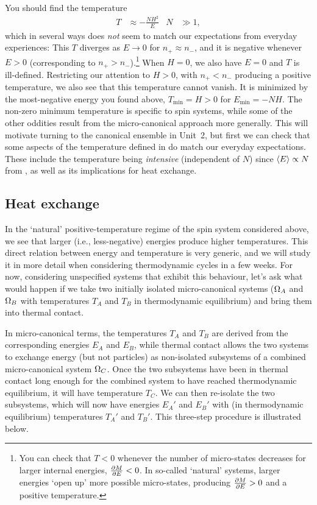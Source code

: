 You should find the temperature
\begin{align}
  T & \approx -\frac{NH^2}{E} &
  N & \gg 1,
\end{align}
which in several ways does \textit{not} seem to match our expectations from everyday experiences: This $T$ diverges as $E \to 0$ for $n_+ \approx n_-$, and it is negative whenever $E > 0$ (corresponding to $n_+ > n_-$).\footnote{You can check that $T < 0$ whenever the number of micro-states decreases for larger internal energies, $\frac{\partial M}{\partial E} < 0$.  In so-called `natural' systems, larger energies `open up' more possible micro-states, producing $\frac{\partial M}{\partial E} > 0$ and a positive temperature.}
When $H = 0$, we also have $E = 0$ and $T$ is ill-defined.
Restricting our attention to $H > 0$, with $n_+ < n_-$ producing a positive temperature, we also see that this temperature cannot vanish.
It is minimized by the most-negative energy you found above, $T_{\text{min}} = H > 0$ for $E_{\text{min}} = -NH$.
The non-zero minimum temperature is specific to spin systems, while some of the other oddities result from the micro-canonical approach more generally.
This will motivate turning to the canonical ensemble in Unit~2, but first we can check that some aspects of the temperature defined in  do match our everyday expectations.
These include the temperature being \textit{intensive} (independent of $N$) since $\left\langle E \right\rangle \propto N$ from , as well as its implications for heat exchange.



\subsection{\label{sec:heat_ex}Heat exchange}
In the `natural' positive-temperature regime of the spin system considered above, we see that larger (i.e., less-negative) energies produce higher temperatures.
This direct relation between energy and temperature is very generic, and we will study it in more detail when considering thermodynamic cycles in a few weeks.
For now, considering unspecified systems that exhibit this behaviour, let's ask what would happen if we take two initially isolated micro-canonical systems ($\Omega_A$ and $\Omega_B$ with temperatures $T_A$ and $T_B$ in thermodynamic equilibrium) and bring them into thermal contact.

In micro-canonical terms, the temperatures $T_A$ and $T_B$ are derived from the corresponding energies $E_A$ and $E_B$, while thermal contact allows the two systems to exchange energy (but not particles) as non-isolated subsystems of a combined micro-canonical system $\Omega_C$.
Once the two subsystems have been in thermal contact long enough for the combined system to have reached thermodynamic equilibrium, it will have temperature $T_C$.
We can then re-isolate the two subsystems, which will now have energies $E_A'$ and $E_B'$ with (in thermodynamic equilibrium) temperatures $T_A'$ and $T_B'$.
This three-step procedure is illustrated below.


